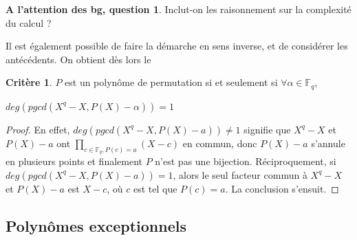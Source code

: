 \documentclass[12pt]{article}
\newcommand{\Fq}{\mathds{F}_q}
\theoremstyle{definition}
\newtheorem{crit}{Critère}
\newtheorem{bg}{A l'attention des bg, question}
\begin{document}
\begin{bg}
Inclut-on les raisonnement sur la complexité du calcul ?
\end{bg}

Il est également possible de faire la démarche en sens inverse, et de considérer les antécédents. On obtient dès lors le

\begin{crit}
$P$ est un polynôme de permutation si et seulement si $\forall \alpha \in \Fq$, 
\begin{center}$deg(pgcd(X^q -X, P(X)-\alpha)) = 1$\end{center}
\end{crit}

\begin{proof}
En effet, $deg(pgcd(X^q -X, P(X)-a)) \neq 1$ signifie que $X^q - X$ et $P(X) - a$ ont $\displaystyle\prod_{c \in \Fq, P(c) = a}(X-c)$ en commun, donc $P(X) - a$ s'annule en plusieurs points et finalement $P$ n'est pas une bijection. \newline
Réciproquement, si $deg(pgcd(X^q -X, P(X)-a)) = 1$, alors le seul facteur commun à $X^q - X$ et $P(X) - a$ est $X-c$, où $c$ est tel que $P(c) = a$. La conclusion s'ensuit.
\end{proof}


\subsection{Polynômes exceptionnels}
\end{document}
